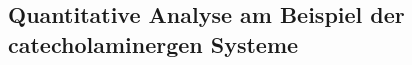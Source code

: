 \documentclass[12pt,a4paper,pdftex]{article}
\begin{document}
\subsection{Quantitative Analyse am Beispiel der catecholaminergen Systeme}
\label{sec:immu}

\end{document}
